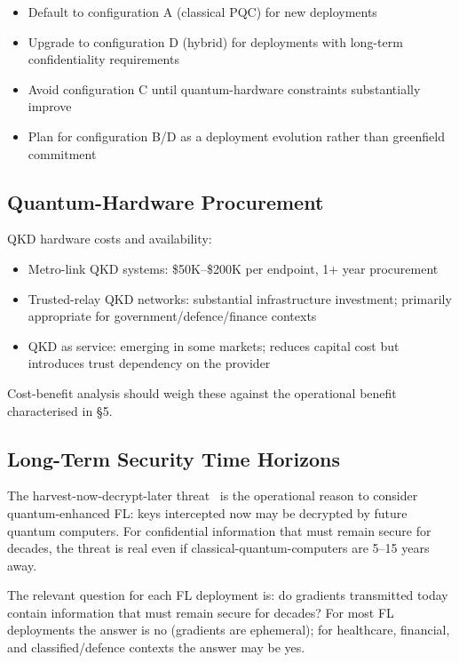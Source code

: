 \documentclass[sigconf,nonacm]{acmart}
\begin{document}
\begin{itemize}
  \item Default to configuration A (classical PQC) for new
        deployments
  \item Upgrade to configuration D (hybrid) for deployments
        with long-term confidentiality requirements
  \item Avoid configuration C until quantum-hardware constraints
        substantially improve
  \item Plan for configuration B/D as a deployment evolution
        rather than greenfield commitment
\end{itemize}

\subsection{Quantum-Hardware Procurement}

QKD hardware costs and availability:

\begin{itemize}
  \item Metro-link QKD systems: \$50K--\$200K per endpoint, 1+
        year procurement
  \item Trusted-relay QKD networks: substantial infrastructure
        investment; primarily appropriate for
        government/defence/finance contexts
  \item QKD as service: emerging in some
        markets; reduces capital cost but introduces trust
        dependency on the provider
\end{itemize}

Cost-benefit analysis should weigh these against the operational
benefit characterised in §5.

\subsection{Long-Term Security Time Horizons}

The harvest-now-decrypt-later threat~\cite{nist2024hndl} is the
operational reason to consider quantum-enhanced FL: keys
intercepted now may be decrypted by future quantum computers.
For confidential information that must remain secure for
decades, the threat is real even if classical-quantum-computers
are 5--15 years away.

The relevant question for each FL deployment is: do gradients
transmitted today contain information that must remain secure
for decades? For most FL deployments the answer is no (gradients
are ephemeral); for healthcare, financial, and
classified/defence contexts the answer may be yes.
\end{document}
